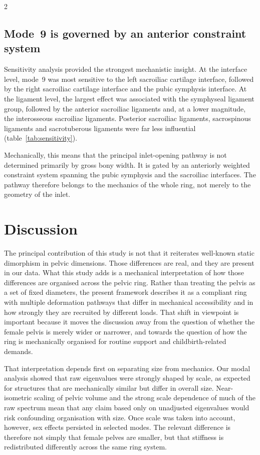 \documentclass[openacc]{rsproca_new}
\begin{document}
\begin{multicols}{2}
\subsection{Mode~9 is governed by an anterior constraint system}

Sensitivity analysis provided the strongest mechanistic insight. At the interface level, mode~9 was most sensitive to the left sacroiliac cartilage interface, followed by the right sacroiliac cartilage interface and the pubic symphysis interface. At the ligament level, the largest effect was associated with the symphyseal ligament group, followed by the anterior sacroiliac ligaments and, at a lower magnitude, the interosseous sacroiliac ligaments. Posterior sacroiliac ligaments, sacrospinous ligaments and sacrotuberous ligaments were far less influential (table~\ref{tab:sensitivity}).

Mechanically, this means that the principal inlet-opening pathway is not determined primarily by gross bony width. It is gated by an anteriorly weighted constraint system spanning the pubic symphysis and the sacroiliac interfaces. The pathway therefore belongs to the mechanics of the whole ring, not merely to the geometry of the inlet.

\section{Discussion}

The principal contribution of this study is not that it reiterates well-known static dimorphism in pelvic dimensions. Those differences are real, and they are present in our data. What this study adds is a mechanical interpretation of how those differences are organised across the pelvic ring. Rather than treating the pelvis as a set of fixed diameters, the present framework describes it as a compliant ring with multiple deformation pathways that differ in mechanical accessibility and in how strongly they are recruited by different loads. That shift in viewpoint is important because it moves the discussion away from the question of whether the female pelvis is merely wider or narrower, and towards the question of how the ring is mechanically organised for routine support and childbirth-related demands.

That interpretation depends first on separating size from mechanics. Our modal analysis showed that raw eigenvalues were strongly shaped by scale, as expected for structures that are mechanically similar but differ in overall size. Near-isometric scaling of pelvic volume and the strong scale dependence of much of the raw spectrum mean that any claim based only on unadjusted eigenvalues would risk confounding organisation with size. Once scale was taken into account, however, sex effects persisted in selected modes. The relevant difference is therefore not simply that female pelves are smaller, but that stiffness is redistributed differently across the same ring system.


\end{multicols}
\end{document}
